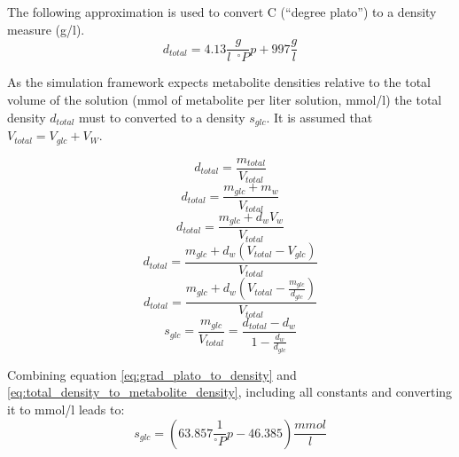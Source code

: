 \appendices
\section{}\label{ap:super_fancy_stuff}
The following approximation is used to convert \textdegree C (``degree plato'') to a density measure (g/l)\cite{bubnik1995sugar}.
\begin{equation} \label{eq:grad_plato_to_density}
 d_{total} = 4.13 \frac{g}{l \,\,\, ^\circ P} p + 997 \frac{g}{l}
\end{equation}

As the simulation framework expects metabolite densities relative to the total volume of the solution (mmol of metabolite per liter
solution, mmol/l) the total density $d_{total}$ must to converted to a density $s_{glc}$. It is assumed that $V_{total} = V_{glc} + V_W$.

\begin{equation*}
 d_{total} = \frac{m_{total}}{V_{total}}
\end{equation*}
\begin{equation*}
 d_{total} = \frac{m_{glc} + m_w}{V_{total}}
\end{equation*}
\begin{equation*}
 d_{total} = \frac{m_{glc} + d_w V_w}{V_{total}}
\end{equation*}
\begin{equation*}
 d_{total} = \frac{m_{glc} + d_w \left(V_{total} - V_{glc}\right)}{V_{total}}
\end{equation*}
\begin{equation*}
 d_{total} = \frac{m_{glc} + d_w \left(V_{total} - \frac{m_{glc}}{d_{glc}}\right)}{V_{total}}
\end{equation*}
\begin{equation} \label{eq:total_density_to_metabolite_density}
 s_{glc} = \frac{m_{glc}}{V_{total}} = \frac{d_{total} - d_w}{1 - \frac{d_w}{d_{glc}}}
\end{equation}

Combining equation \ref{eq:grad_plato_to_density} and \ref{eq:total_density_to_metabolite_density}, including all constants and converting it to mmol/l leads to:
\begin{equation} \label{eq:ready_to_use_plato_to_metabolite_density}
 s_{glc} = \left( 63.857 \frac{1}{^\circ P} p - 46.385 \right) \frac{mmol}{l}
\end{equation}




